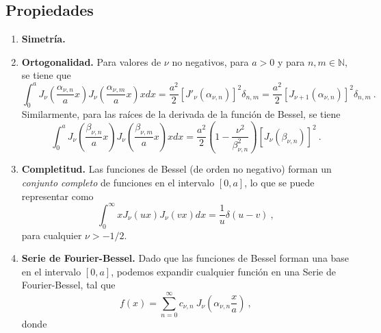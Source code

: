 \subsection{Propiedades}
\begin{enumerate}
    \item \textbf{Simetría.}
    \item \textbf{Ortogonalidad.} Para valores de $\nu$ no negativos, para $a > 0$ y para $n, m \in \mathbb{N}$, se tiene que
    \begin{equation}
        \int_0^a J_{\nu} \left( \frac{\alpha_{\nu, n}}{a} x \right) J_\nu\left( \frac{\alpha_{\nu, m}}{a} x \right) x dx = \frac{a^2}{2} [J'_\nu(\alpha_{\nu, n})]^2 \delta_{n, m} = \frac{a^2}{2} [J_{\nu+1}(\alpha_{\nu, n})]^2 \delta_{n, m} \ .
    \end{equation}
    Similarmente, para las raíces de la derivada de la función de Bessel, se tiene
    \begin{equation}
        \int_0^a J_\nu\left(\frac{\beta_{\nu, n}}{a}x \right) J_\nu\left(\frac{\beta_{\nu, m}}{a}x \right) x dx = \frac{a^2}{2} \left( 1 - \frac{\nu^2}{\beta^2_{\nu, n}} \right) \left[ J_\nu(\beta_{\nu, n}) \right]^2 \ .
    \end{equation}
    \item \textbf{Completitud.} Las funciones de Bessel (de orden no negativo) forman un \emph{conjunto completo} de funciones en el intervalo $[0,a]$, lo que se puede representar como
    \begin{equation}
        \int_0^\infty x J_\nu(ux) J_\nu(vx) dx = \frac{1}{u} \delta(u-v) \ ,
    \end{equation}
    para cualquier $\nu > -1/2$.
    \item \textbf{Serie de Fourier-Bessel.} Dado que las funciones de Bessel forman una base en el intervalo $[0,a]$, podemos expandir cualquier función en una Serie de Fourier-Bessel, tal que
    \begin{equation}
        f(x) = \sum_{n=0}^\infty c_{\nu, n} \ J_\nu\left(\alpha_{\nu, n} \frac{x}{a}\right) \ ,
    \end{equation}
    donde
    \begin{equation}

\end{equation}
\end{enumerate}
